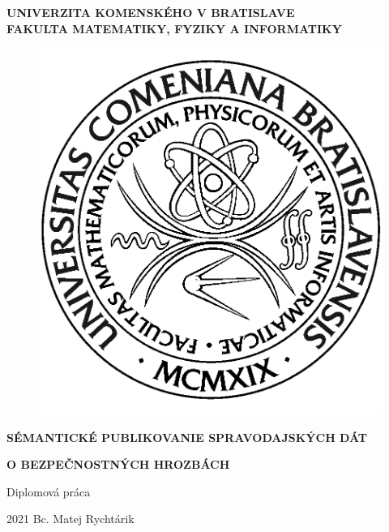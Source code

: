 \documentclass[12pt, a4paper, oneside]{book}
\newcommand\mftitle{Sémantické publikovanie spravodajských dát}
\newcommand\mftitlen{o bezpečnostných hrozbách}
\newcommand\mfthesistype{Diplomová práca}
\newcommand\mfauthor{Bc. Matej Rychtárik}
\newcommand\mfuniversity{UNIVERZITA KOMENSKÉHO V BRATISLAVE}
\newcommand\mffaculty{FAKULTA MATEMATIKY, FYZIKY A INFORMATIKY}
\begin{document}
\frontmatter

\thispagestyle{empty}

\noindent
\begin{minipage}{\textwidth}
\begin{center}
\textbf{\mfuniversity \\
\mffaculty}
\end{center}
\end{minipage}

\vfill
\begin{figure}[!hbt]
	\begin{center}
		\includegraphics{images/logo_fmph}
		\label{img:logo}
	\end{center}
\end{figure}
\begin{center}
	\begin{minipage}{0.8\textwidth}
		\centerline{\textbf{\Large\MakeUppercase{\mftitle}}}
		\centerline{\textbf{\Large\MakeUppercase{\mftitlen}}}
		\smallskip
		\centerline{\mfthesistype}
	\end{minipage}
\end{center}
\vfill
2021 \hfill
\mfauthor
\eject 

\thispagestyle{empty}
\end{document}
